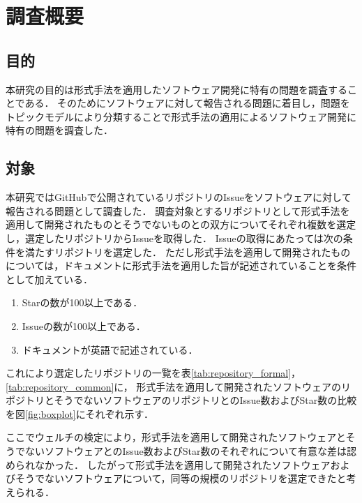 \documentclass[main]{subfiles}
\begin{document}
\chapter{調査概要}

\section{目的}

本研究の目的は形式手法を適用したソフトウェア開発に特有の問題を調査することである．
そのためにソフトウェアに対して報告される問題に着目し，問題をトピックモデルにより分類することで形式手法の適用によるソフトウェア開発に特有の問題を調査した．


\section{対象}
\label{sec:survey-target}

本研究ではGitHubで公開されているリポジトリのIssueをソフトウェアに対して報告される問題として調査した．
調査対象とするリポジトリとして形式手法を適用して開発されたものとそうでないものとの双方についてそれぞれ複数を選定し，選定したリポジトリからIssueを取得した．
Issueの取得にあたっては次の条件を満たすリポジトリを選定した．
ただし形式手法を適用して開発されたものについては，ドキュメントに形式手法を適用した旨が記述されていることを条件として加えている．

\begin{enumerate}
	\item Starの数が100以上である．
	\item Issueの数が100以上である．
	\item ドキュメントが英語で記述されている．
\end{enumerate}

これにより選定したリポジトリの一覧を表\ref{tab:repository_formal}，\ref{tab:repository_common}に，
形式手法を適用して開発されたソフトウェアのリポジトリとそうでないソフトウェアのリポジトリとのIssue数およびStar数の比較を図\ref{fig:boxplot}にそれぞれ示す．

ここでウェルチの検定により，形式手法を適用して開発されたソフトウェアとそうでないソフトウェアとのIssue数およびStar数のそれぞれについて有意な差は認められなかった．
したがって形式手法を適用して開発されたソフトウェアおよびそうでないソフトウェアについて，同等の規模のリポジトリを選定できたと考えられる．
\end{document}
